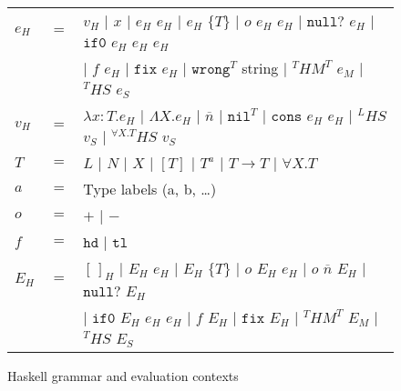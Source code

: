 \begin{figure}[p]
\centering
\begin{tabular}{lcl}
\vspace{5pt}

$e_{H}$ & $=$ & $v_{H}$ $\vert$ $x$ $\vert$ $e_{H}$ $e_{H}$ $\vert$ $e_{H}$ $\lbrace T\rbrace$ $\vert$ $o$ $e_{H}$ $e_{H}$ $\vert$ $\mathtt{null?}$ $e_{H}$ $\vert$ $\mathtt{if0}$ $e_{H}$ $e_{H}$ $e_{H}$ \\

\vspace{5pt}

&& $\vert$ $f$ $e_{H}$ $\vert$ $\mathtt{fix}$ $e_{H}$ $\vert$ $\mathtt{wrong}^{T}$ string $\vert$ $^{T}HM^{T}$ $e_{M}$ $\vert$ $^{T}HS$ $e_{S}$ \\

\vspace{5pt}

$v_{H}$ & $=$ & $\lambda x:T.e_{H}$ $\vert$ $\Lambda X.e_{H}$ $\vert$ $\overline{n}$ $\vert$ $\mathtt{nil}^{T}$ $\vert$ $\mathtt{cons}$ $e_{H}$ $e_{H}$ $\vert$ $^{L}HS$ $v_{S}$ $\vert$ $^{\forall X.T}HS$ $v_{S}$ \\

\vspace{5pt}

$T$ & $=$ & $L$ $\vert$ $N$ $\vert$ $X$ $\vert$ $[T]$ $\vert$ $T^{a}$ $\vert$ $T\rightarrow T$ $\vert$ $\forall X.T$ \\

\vspace{5pt}

$a$ & $=$ & Type labels (a, b, \ldots) \\

\vspace{5pt}

$o$ & $=$ & $+$ $\vert$ $-$ \\

\vspace{5pt}

$f$ & $=$ & $\mathtt{hd}$ $\vert$ $\mathtt{tl}$ \\

\vspace{5pt}

$E_{H}$ & $=$ & $[\,]_{H}$ $\vert$ $E_{H}$ $e_{H}$ $\vert$ $E_{H}$ $\lbrace T\rbrace$ $\vert$ $o$ $E_{H}$ $e_{H}$ $\vert$ $o$ $\overline{n}$ $E_{H}$ $\vert$ $\mathtt{null?}$ $E_{H}$ \\

\vspace{5pt}

&& $\vert$ $\mathtt{if0}$ $E_{H}$ $e_{H}$ $e_{H}$ $\vert$ $f$ $E_{H}$ $\vert$ $\mathtt{fix}$ $E_{H}$ $\vert$ $^{T}HM^{T}$ $E_{M}$ $\vert$ $^{T}HS$ $E_{S}$
\end{tabular}
\caption{Haskell grammar and evaluation contexts}
\label{chg}
\end{figure}